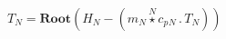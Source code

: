 \documentclass[border=2pt]{standalone}
\begin{document}
${T}{_{N}}=\textbf{Root}\left( {H}{_{N}}  - \left({m}{_{N}} \stackrel{N}{\star} {{c_p}}{_{N}} \, . \, {T}{_{N}}\right)\right)$
\end{document}
